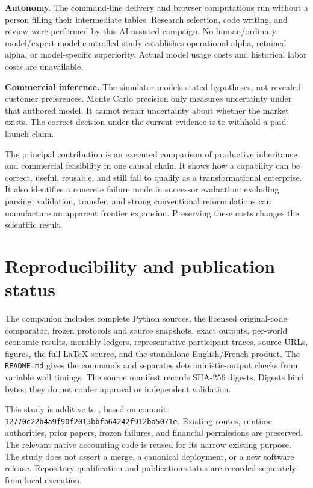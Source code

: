 \documentclass[11pt,letterpaper]{article}
\begin{document}
\textbf{Autonomy.} The command-line delivery and browser computations run without a
person filling their intermediate tables. Research selection, code writing, and review
were performed by this AI-assisted campaign. No human/ordinary-model/expert-model
controlled study establishes operational alpha, retained alpha, or model-specific
superiority. Actual model usage costs and historical labor costs are unavailable.

\textbf{Commercial inference.} The simulator models stated hypotheses, not revealed
customer preferences. Monte Carlo precision only measures uncertainty under that
authored model. It cannot repair uncertainty about whether the market exists. The
correct decision under the current evidence is to withhold a paid-launch claim.

The principal contribution is an executed comparison of productive inheritance and
commercial feasibility in one causal chain. It shows how a capability can be correct,
useful, reusable, and still fail to qualify as a transformational enterprise. It also
identifies a concrete failure mode in successor evaluation: excluding parsing,
validation, transfer, and strong conventional reformulations can manufacture an
apparent frontier expansion. Preserving these costs changes the scientific result.

\section{Reproducibility and publication status}

The companion includes complete Python sources, the licensed original-code comparator,
frozen protocols and source snapshots, exact outputs, per-world economic results,
monthly ledgers, representative participant traces, source URLs, figures, the full
LaTeX source, and the standalone English/French product. The \texttt{README.md} gives
the commands and separates deterministic-output checks from variable wall timings.
The source manifest records SHA-256 digests. Digests bind bytes; they do not confer
approval or independent validation.

This study is additive to , based on commit
\nolinkurl{12770c22b4a9f90f2013bbfb64242f912ba5071e}. Existing routes, runtime authorities,
prior papers, frozen failures, and financial permissions are preserved. The relevant
native accounting code is reused for its narrow existing purpose. The study does
not assert a merge, a canonical deployment, or a new software release. Repository
qualification and publication status are recorded separately from local execution.
\end{document}
